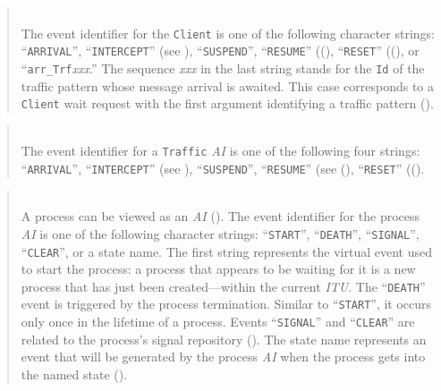 \begin{quote}
\noindent{} \hspace{0in}\vspace{0.05in}\\
\noindent
The event identifier for the {\tt Client}
is one of the following character strings:
``{\tt ARRIVAL}'',
``{\tt INTERCEPT}'' (see ), 
``{\tt SUSPEND}'',
``{\tt RESUME}'' ((),
``{\tt RESET}'' ((),
or ``{\tt arr\_Trf}{\em xxx\/}.''
The sequence {\em xxx\/} in the last string stands for the {\tt Id} of
the traffic pattern whose message arrival is awaited.
This case corresponds to a {\tt Client} wait request with the first argument
identifying a traffic pattern ().
\end{quote}

\begin{quote}
\noindent{} \hspace{0in}\vspace{0.05in}\\
\noindent
The event identifier for a {\tt Traffic} {\em AI\/}
is one of the following four strings: ``{\tt ARRIVAL}'', ``{\tt INTERCEPT}''
(see ), ``{\tt SUSPEND}'',
``{\tt RESUME}'' (see (),
``{\tt RESET}'' (().
\end{quote}

\begin{quote}
\noindent{} \hspace{0in}\vspace{0.05in}\\
\noindent
A process can be viewed as an {\em AI\/} ().
The event identifier for the process {\em AI\/}
is one of the following character strings:
``{\tt START}'', ``{\tt DEATH}'', ``{\tt SIGNAL}'', ``{\tt CLEAR}'',
or a state name.
The first string represents the virtual event used to start the process:
a process that appears to be waiting for it is a new process that has just been
created---within the current {\em ITU}.
The ``{\tt DEATH}'' event is triggered by the process termination.
Similar to ``{\tt START}'', it occurs only once in the lifetime of a
process.
Events ``{\tt SIGNAL}'' and ``{\tt CLEAR}'' are related to the process's
signal repository ().
The state name represents an event that will be generated by the process
{\em AI\/} when the process gets into the named state ().
\end{quote}

